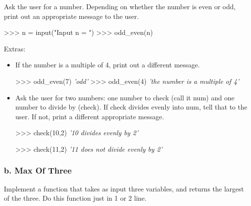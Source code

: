 \documentclass[11pt]{article}
\newenvironment{Shaded}{}{}
\newcommand{\DecValTok}[1]{\textcolor[rgb]{0.25,0.63,0.44}{{#1}}}
\newcommand{\StringTok}[1]{\textcolor[rgb]{0.25,0.44,0.63}{{#1}}}
\newcommand{\CommentTok}[1]{\textcolor[rgb]{0.38,0.63,0.69}{\textit{{#1}}}}
\newcommand{\NormalTok}[1]{{#1}}
\newcommand{\OperatorTok}[1]{\textcolor[rgb]{0.40,0.40,0.40}{{#1}}}
\newcommand{\BuiltInTok}[1]{{#1}}
\begin{document}
Ask the user for a number. Depending on whether the number is even or
odd, print out an appropriate message to the user.

\begin{Shaded}
\begin{Highlighting}[]
\OperatorTok{>>>}\NormalTok{ n }\OperatorTok{=} \BuiltInTok{input}\NormalTok{(}\StringTok{"Input n = "}\NormalTok{)}
\OperatorTok{>>>}\NormalTok{ odd_even(n) }
\end{Highlighting}
\end{Shaded}

Extras:

\begin{itemize}
\item
  If the number is a multiple of 4, print out a different message.

\begin{Shaded}
\begin{Highlighting}[]
\OperatorTok{>>>}\NormalTok{ odd_even(}\DecValTok{7}\NormalTok{)}
  \CommentTok{'odd'}
\OperatorTok{>>>}\NormalTok{ odd_even(}\DecValTok{4}\NormalTok{)}
  \CommentTok{'the number is a multiple of 4'} 
\end{Highlighting}
\end{Shaded}
\item
  Ask the user for two numbers: one number to check (call it num) and
  one number to divide by (check). If check divides evenly into num,
  tell that to the user. If not, print a different appropriate message.

\begin{Shaded}
\begin{Highlighting}[]
\OperatorTok{>>>}\NormalTok{ check(}\DecValTok{10}\NormalTok{,}\DecValTok{2}\NormalTok{)}
    \CommentTok{'10 divides evenly by 2'}

\OperatorTok{>>>}\NormalTok{ check(}\DecValTok{11}\NormalTok{,}\DecValTok{2}\NormalTok{)}
    \CommentTok{'11 does not divide evenly by 2'}
\end{Highlighting}
\end{Shaded}
\end{itemize}

    \subsubsection{b. Max Of Three}\label{b.-max-of-three}

Implement a function that takes as input three variables, and returns
the largest of the three. Do this function just in 1 or 2 line.
\end{document}
